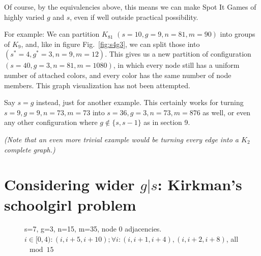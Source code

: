 \documentclass[11pt, oneside]{article} 	%
\begin{document}
Of course, by the equivalencies above, this means we can make Spot It Games of highly varied $g$ and $s$, even if well outside practical possibility.

For example: We can partition $K_{81}$ $(s=10, g=9, n=81,m=90)$ into groups of $K_9$, and, like in figure Fig.~\ref{fig:s4g3}, we can split those into $(s^*=4, g^*=3, n=9,m=12)$. This gives us a new partition of configuration $(s=40,g=3,n=81,m=1080)$, in which every node still has a uniform number of attached colors, and every color has the same number of node members. This graph visualization has not been attempted.

Say $s=g$ instead, just for another example. This certainly works for turning $s=9, g=9, n=73, m=73$ into $s=36,g=3,n=73,m=876$ as well, or even any other configuration where $g \notin \{s, s-1 \}$ as in section 9.

\emph{(Note that an even more trivial example would be turning every edge into a $K_2$ complete graph.)}


\section{Considering wider $g|s$: Kirkman's schoolgirl problem}


\begin{figure}[!htb]
\centering
{}
\caption{s=7, g=3, n=15, m=35, node 0 adjacencies. $i \in [0, 4): (i, i+5, i+10); \forall i: (i, i+1, i+4), (i, i+2, i+8)$, all $\mod 15$}
\label{fig:s7g3}
\end{figure}
\end{document}
